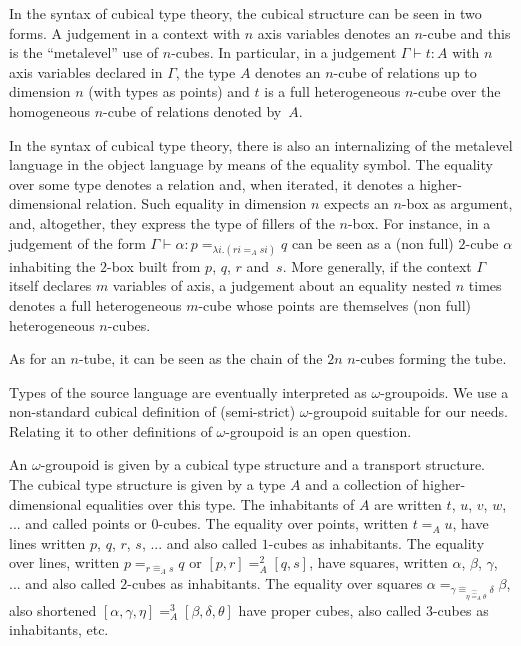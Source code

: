 \documentclass{article}
\begin{document}
In the syntax of cubical type theory, the cubical structure can be
seen in two forms. A judgement in a context with $n$ axis variables
denotes an $n$-cube and this is the ``metalevel'' use of $n$-cubes. In
particular, in a judgement $\Gamma \vdash t:A$ with $n$ axis variables
declared in $\Gamma$, the type $A$ denotes an $n$-cube of relations up to dimension
$n$ (with types as points) and $t$ is a full heterogeneous $n$-cube
over the homogeneous $n$-cube of relations denoted by~$A$.

In the syntax of cubical type theory, there is also an internalizing
of the metalevel language in the object language by means of the
equality symbol. The equality over some type denotes a relation and,
when iterated, it denotes a higher-dimensional relation. Such equality
in dimension $n$ expects an $n$-box as argument, and, altogether, they
express the type of fillers of the $n$-box. For instance, in a
judgement of the form $\Gamma \vdash \alpha:p =_{\lambda i.(r i =_A s
  i)} q$ can be seen as a (non full) $2$-cube $\alpha$ inhabiting the
$2$-box built from $p$, $q$, $r$ and~$s$. More generally, if the
context $\Gamma$ itself declares $m$ variables of axis, a judgement
about an equality nested $n$ times denotes a full heterogeneous $m$-cube whose
points are themselves (non full) heterogeneous $n$-cubes.

As for an $n$-tube, it can be seen as the chain of the $2n$ $n$-cubes
forming the tube.

\iffalse
Types of the source language are eventually interpreted as
$\omega$-groupoids. We use a non-standard cubical definition of
(semi-strict) $\omega$-groupoid suitable for our needs. Relating it to
other definitions of $\omega$-groupoid is an open question.

An $\omega$-groupoid is given by a cubical type structure and a
transport structure. The cubical type structure is given by a type $A$
and a collection of higher-dimensional equalities over this type. The
inhabitants of $A$ are written $t$, $u$, $v$, $w$, ... and called
points or $0$-cubes. The equality over points, written $t =_A u$, have
lines written $p$, $q$, $r$, $s$, ... and also called $1$-cubes as
inhabitants. The equality over lines, written $p =_{r \hat{=}_A s} q$
or $[p,r] =^2_A [q,s]$, have squares, written $\alpha$, $\beta$,
$\gamma$, ... and also called $2$-cubes as inhabitants.  The equality
over squares $\alpha =_{\gamma \hat{=}_{\eta \widehat{\hat{=}}_A
    \theta} \delta} \beta$, also shortened $[\alpha,\gamma,\eta] =^3_A
[\beta,\delta,\theta]$ have proper cubes, also called $3$-cubes as
inhabitants, etc.
\end{document}
